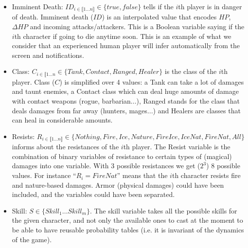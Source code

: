 \begin{itemize}
    \item Imminent Death: $ID_{i \in \llbracket 1 \dots n \rrbracket} \in \{true, false\}$ tells if the $i$th player is in danger of death. Imminent death ($ID$) is an interpolated value that encodes $HP$, $\Delta HP$ and incoming attacks/attackers. %
This is a Boolean variable saying if the $i$th character if going to die anytime soon. This is an example of what we consider that an experienced human player will infer automatically from the screen and notifications. 
    \item Class: $C_{i \in \llbracket 1 \dots n} \in \{Tank, Contact, Ranged, Healer\}$ is the class of the $i$th player. Class ($C$) is simplified over 4 values: a Tank can take a lot of damages and taunt enemies, a Contact class which can deal huge amounts of damage with contact weapons (rogue, barbarian...), Ranged stands for the class that deals damages from far away (hunters, mages...) and Healers are classes that can heal in considerable amounts. 
    \item Resists: $R_{i \in \llbracket 1 \dots n \rrbracket} \in \{Nothing, Fire, Ice, Nature, FireIce, IceNat, FireNat, All\}$ informs about the resistances of the $i$th player. The Resist variable is the combination of binary variables of resistance to certain types of (magical) damages into one variable. With 3 possible resistances we get ($2^3$) 8 possible values. For instance ``$R_i=FireNat$'' means that the $i$th character resists fire and nature-based damages. Armor (physical damages) could have been included, and the variables could have been separated. 
    \item Skill: $S \in \{Skill_1 \dots Skill_m\}$. The skill variable takes all the possible skills for the given character, and not only the available ones to cast at the moment to be able to have reusable probability tables (i.e. it is invariant of the dynamics of the game).
\end{itemize}

